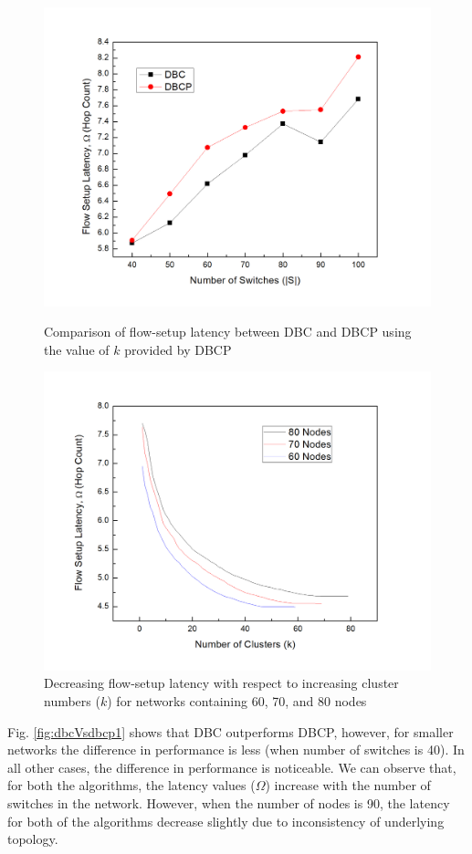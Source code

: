 \documentclass{IEEEtran}
\begin{document}
	\begin{figure}
		\includegraphics[width=\linewidth]{Figures/dbc_vs_dbcp1.jpg}
		\caption{Comparison of flow-setup latency between DBC and DBCP using the value of $k$ provided by DBCP}
		\label{fig:dbcVsdbcp1}
		\includegraphics[width=\linewidth]{Figures/kGraph.jpg}
		\caption{Decreasing flow-setup latency with respect to increasing cluster numbers ($k$) for networks containing 60, 70, and 80 nodes}
		\label{fig:kGraph}
	\end{figure}
	Fig. \ref{fig:dbcVsdbcp1} shows that DBC outperforms DBCP, however, for smaller networks the difference in performance is less (when number of switches is 40). In all other cases, the difference in performance is noticeable. We can observe that, for both the algorithms, the latency values ($\Omega$) increase with the number of switches in the network. However, when the number of nodes is 90, the latency for both of the algorithms decrease slightly due to inconsistency of underlying topology.
	
\end{document}
